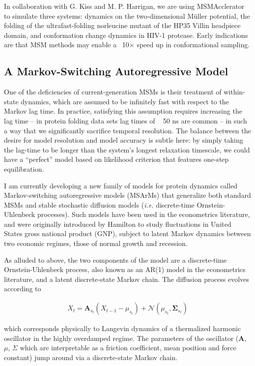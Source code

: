 \documentclass[twocolumn,floatfix,nofootinbib,aps]{revtex4-1}
\begin{document}
In collaboration with G. Kiss and M. P. Harrigan, we are using MSMAcclerator to simulate three systems: dynamics on the two-dimensional M\"{u}ller potential, the folding of the ultrafast-folding norleucine mutant of the HP35 Villin headpiece domain\cite{Kubelka2006Sub}, and conformation change dynamics in HIV-1 protease. Early indications are that MSM methods may enable a ~10$\times$ speed up in conformational sampling.

\subsection{A Markov-Switching Autoregressive Model}

One of the deficiencies of current-generation MSMs is their treatment of within-state dynamics, which are assumed to be infinitely fast with respect to the Markov lag time. In practice, satisfying this assumption requires increasing the lag time -- in protein folding data sets lag times of ~ 50 ns are common -- in such a way that we significantly sacrifice temporal resolution. The balance between the desire for model resolution and model accuracy is subtle here: by simply taking the lag-time to be longer than the system's longest relaxation timescale, we could have a ``perfect'' model based on likelihood criterion that features one-step equilibration.

I am currently developing a new family of models for protein dynamics called Markov-switching autoregressive models (MSArMs) that generalize both standard MSMs and stable stochastic diffusion models (\emph{i.e.} discrete-time Ornstein-Uhlenbeck processes). Such models have been used in the econometrics literature, and were originally introduced by Hamilton\cite{Hamilton1989New, Hamilton1990Analysis} to study fluctuations in United States gross national product (GNP), subject to latent Markov dynamics between two economic regimes, those of normal growth and recession.

As alluded to above, the two components of the model are a discrete-time Ornstein-Uhlenbeck process, also known as an AR(1) model in the econometrics literature, and a latent discrete-state Markov chain. The diffusion process evolves according to

\begin{align}
X_t = \mathbf{A}_{s_t} (X_{t-1} - \mu_{s_t}) + \mathcal{N}(\mu_{s_t}, \mathbf{\Sigma}_{s_t})
\end{align}

which corresponds physically to Langevin dynamics of a thermalized harmonic oscillator in the highly overdamped regime. The parameters of the oscillator ($\mathbf{A}$, $\mu$, $\Sigma$ which are interpretable as a friction coefficient, mean position and force constant) jump around via a discrete-state Markov chain.
\end{document}
